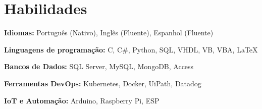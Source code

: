 \section{Habilidades}
	\textbf{Idiomas:} Português (Nativo), Inglês (Fluente), Espanhol (Fluente)

	\vspace{0.1 cm}

	\textbf{Linguagens de programação:} C, C\#, Python, SQL, VHDL, VB, VBA, LaTeX
	
	\vspace{0.1 cm}

	\textbf{Bancos de Dados:} SQL Server, MySQL, MongoDB, Access

	\vspace{0.1 cm}

	\textbf{Ferramentas DevOps:} Kubernetes, Docker, UiPath, Datadog
	
	\vspace{0.1 cm}

	\textbf{IoT e Automação:} Arduino, Raspberry Pi, ESP